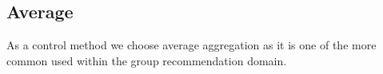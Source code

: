 \subsection{Average}\label{sec:average}
As a control method we choose average aggregation as it is one of the more common used within the group recommendation domain.